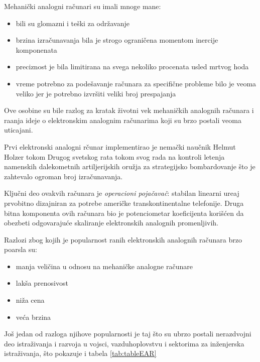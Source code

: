 \documentclass[a4paper]{article}
\begin{document}
{			\par Mehani\v{c}ki analogni ra\v{c}unari su imali mnoge mane:
			\begin{itemize}
				\item bili su glomazni i te\v{s}ki za odr\v{z}avanje
				\item brzina izra\v{c}unavanja bila je strogo ograni\v{c}ena momentom inercije komponenata
				\item preciznost je bila limitirana na svega nekoliko procenata usled mrtvog hoda
				\item vreme potrebno za pode\v{s}avanje ra\v{c}unara za specifi\v{c}ne probleme bilo je veoma veliko jer je potrebno izvr\v{s}iti veliki broj prespajanja
			\end{itemize}
			\par Ove osobine su bile razlog za kratak \v{z}ivotni vek mehani\v{c}kih analognih ra\v{c}unara i ra\dj{}anja ideje o elektronskim analognim ra\v{c}unarima koji su brzo postali veoma uticajani.
			\par Prvi elektronski analogni r\v{c}unar implementirao je nema\v{c}ki nau\v{c}nik Helmut Holzer tokom Drugog svetskog rata tokom svog rada na kontroli letenja namenskih dalekometnih artiljerijskih oru\v{z}ja za strategijsko bombardovanje \v{s}to je zahtevalo ogroman broj izra\v{c}unavanja. \cite{Holzer}
			\par Klju\v{c}ni deo ovakvih ra\v{c}unara je \emph{operacioni poja\v{c}ava\v{c}}: stabilan linearni ure\dj{}aj prvobitno dizajniran za potrebe ameri\v{c}ke transkontinentalne telefonije. Druga bitna komponenta ovih ra\v{c}unara bio je potenciometar koeficijenta kori\v{s}\'{c}en da obezbeti odgovaraju\'{c}e skaliranje elektronskih analognih promenljivih.
			\par Razlozi zbog kojih je popularnost ranih elektronskih analognih ra\v{c}unara brzo poarsla su:
			\begin{itemize}
				\item manja veličina u odnosu na mehani\v{c}ke analogne ra\v{c}unare
				\item lak\v{s}a prenosivost
				\item ni\v{z}a cena
				\item  ve\'{c}a brzina
			\end{itemize}
			Jo\v{s} jedan od razloga njihove popularnosti je taj \v{s}to su ubrzo postali nerazdvojni deo istra\v{z}ivanja i razvoja u vojsci, vazduhoplovstvu i sektorima za in\v{z}enjerska istra\v{z}ivanja, \v{s}to pokazuje i tabela \ref{tab:tableEAR} \cite{table}
		
}
\end{document}
